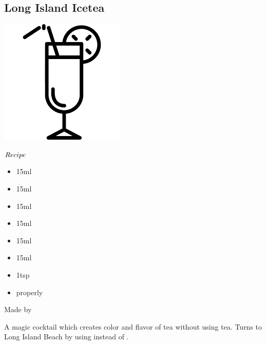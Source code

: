 \subsection{Long Island Icetea}
\vspace{-7.5mm}
\hspace{50mm}
\includegraphics[scale=.07]{cocktail_glass_tall.png}
\vspace{2.5mm}
\begin{itembox}[l]{\boldmath $Recipe$}
\begin{itemize}
\setlength{\parskip}{0cm}
\setlength{\itemsep}{0cm}
\item \gin 15ml
\item \vodka 15ml
\item \teq 15ml
\item \rum 15ml
\item \wc 15ml
\item \lj 15ml
\item \gumsyrup 1tsp
\item \cola properly
\end{itemize}
\vspace{-4mm}
Made by \build
\end{itembox}
A magic cocktail which creates color and flavor of tea without using tea.
Turns to Long Island Beach by using \cj instead of \cola
\hspace{-1mm}.
